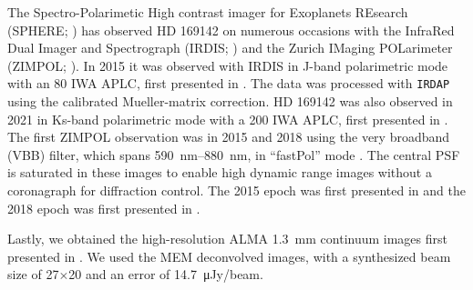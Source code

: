 The Spectro-Polarimetic High contrast imager for Exoplanets REsearch (SPHERE; \citealp{beuzit_sphere_2019}) has observed HD 169142 on numerous occasions with the InfraRed Dual Imager and Spectrograph (IRDIS; \citealp{dohlen_infra-red_2008}) and the Zurich IMaging POLarimeter (ZIMPOL; \citealp{schmid_spherezimpol_2018}). In 2015 it was observed with IRDIS in J-band polarimetric mode \citep{boer_polarimetric_2020} with an \SI{80}{\mas} IWA APLC, first presented in \citet{pohl_circumstellar_2017}. The data was processed with \texttt{IRDAP} \citep{holstein_polarimetric_2020} using the calibrated Mueller-matrix correction. HD 169142 was also observed in 2021 in Ks-band polarimetric mode with a \SI{200}{\mas} IWA APLC, first presented in \citet{ren_protoplanetary_2023}. The first ZIMPOL observation was in 2015 and 2018 using the very broadband (VBB) filter, which spans \SIrange{590}{880}{\nano\meter}, in ``fastPol'' mode \citep{schmid_spherezimpol_2018}. The central PSF is saturated in these images to enable high dynamic range images without a coronagraph for diffraction control. The 2015 epoch was first presented in \citet{bertrang_hd_2018} and the 2018 epoch was first presented in \citet{bertrang_moving_2020}.

Lastly, we obtained the high-resolution ALMA \SI{1.3}{\milli\meter} continuum images first presented in \citet{perez_dust_2019}. We used the MEM deconvolved images, with a synthesized beam size of \SI{27}{\mas}$\times$\SI{20}{\mas} and an error of \SI{14.7}{\micro Jy/beam}.

